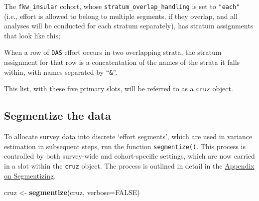 \documentclass[
]{book}
\newenvironment{Shaded}{\begin{snugshade}}{\end{snugshade}}
\newcommand{\DataTypeTok}[1]{\textcolor[rgb]{0.13,0.29,0.53}{#1}}
\newcommand{\DecValTok}[1]{\textcolor[rgb]{0.00,0.00,0.81}{#1}}
\newcommand{\KeywordTok}[1]{\textcolor[rgb]{0.13,0.29,0.53}{\textbf{#1}}}
\newcommand{\NormalTok}[1]{#1}
\newcommand{\OperatorTok}[1]{\textcolor[rgb]{0.81,0.36,0.00}{\textbf{#1}}}
\newcommand{\OtherTok}[1]{\textcolor[rgb]{0.56,0.35,0.01}{#1}}
\newcommand{\StringTok}[1]{\textcolor[rgb]{0.31,0.60,0.02}{#1}}
\begin{document}
The \texttt{fkw\_insular} cohort, whose \texttt{stratum\_overlap\_handling} is set to \texttt{"each"} (i.e., effort is allowed to belong to multiple segments, if they overlap, and all analyses will be conducted for each stratum separately), has stratum assignments that look like this;

\begin{Shaded}
\end{Shaded}

When a row of \texttt{DAS} effort occurs in two overlapping strata, the stratum assignment for that row is a concatentation of the names of the strata it falls within, with names separated by ``\texttt{\&}''.

This list, with these five primary slots, will be referred to as a \texttt{cruz} object.

\hypertarget{segmentize-the-data}{%
\subsection*{Segmentize the data}\label{segmentize-the-data}}

To allocate survey data into discrete `effort segments', which are used in variance estimation in subsequent steps, run the function \texttt{segmentize()}. This process is controlled by both survey-wide and cohort-specific \protect\hypertarget{settings}{}{settings}, which are now carried in a slot within the \texttt{cruz} object. The process is outlined in detail in the \protect\hyperlink{segmentizing}{Appendix on Segmentizing}.

\begin{Shaded}
\begin{Highlighting}[]
\NormalTok{cruz <-}\StringTok{ }\KeywordTok{segmentize}\NormalTok{(cruz, }\DataTypeTok{verbose=}\OtherTok{FALSE}\NormalTok{)}
\end{Highlighting}
\end{Shaded}
\end{document}
